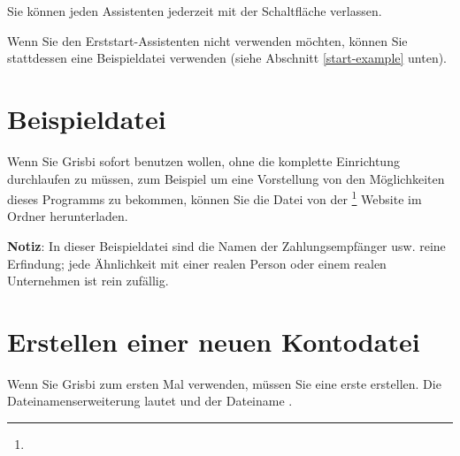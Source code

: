 Sie können jeden Assistenten jederzeit mit der Schaltfläche  verlassen.

Wenn Sie den Erststart-Assistenten nicht verwenden möchten, können Sie stattdessen eine Beispieldatei verwenden (siehe Abschnitt \ref{start-example} unten).

\section{Beispieldatei\label{start-example}}

Wenn Sie Grisbi sofort benutzen wollen, ohne die komplette Einrichtung durchlaufen zu müssen, zum Beispiel um eine Vorstellung von den Möglichkeiten dieses Programms zu bekommen, können Sie die Datei  von der \footnote{\urlSourceForgeDocumentation{}} Website im Ordner  herunterladen.

\textbf{Notiz}: In dieser Beispieldatei sind die Namen der Zahlungsempfänger usw. reine Erfindung; jede Ähnlichkeit mit einer realen Person oder einem realen Unternehmen ist rein zufällig.%

\section{Erstellen einer neuen Kontodatei\label{start-newfile}}

Wenn Sie Grisbi zum ersten Mal verwenden, müssen Sie eine erste  erstellen. Die \gls{Dateinamenserweiterung} lautet  und der Dateiname .%

